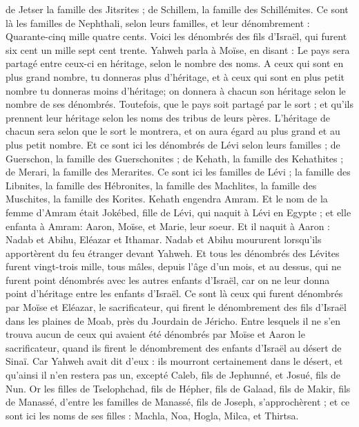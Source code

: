 \begin{multicols}{2}
de Jetser la famille des Jitsrites ; de Schillem, la famille des Schillémites.
Ce sont là les familles de Nephthali, selon leurs familles, et leur dénombrement : Quarante-cinq mille quatre cents.
Voici les dénombrés des fils d'Israël, qui furent six cent un mille sept cent trente.
Yahweh parla à Moïse, en disant :
Le pays sera partagé entre ceux-ci en héritage, selon le nombre des noms.
A ceux qui sont en plus grand nombre, tu donneras plus d'héritage, et à ceux qui sont en plus petit nombre tu donneras moins d'héritage; on donnera à chacun son héritage selon le nombre de ses dénombrés.
Toutefois, que le pays soit partagé par le sort ; et qu'ils prennent leur héritage selon les noms des tribus de leurs pères.
L'héritage de chacun sera selon que le sort le montrera, et on aura égard au plus grand et au plus petit nombre.
Et ce sont ici les dénombrés de Lévi selon leurs familles ; de Guerschon, la famille des Guerschonites ; de Kehath, la famille des Kehathites ; de Merari, la famille des Merarites.
Ce sont ici les familles de Lévi ; la famille des Libnites, la famille des Hébronites, la famille des Machlites, la famille des Muschites, la famille des Korites. Kehath engendra Amram.
Et le nom de la femme d'Amram était Jokébed, fille de Lévi, qui naquit à Lévi en Egypte ; et elle enfanta à Amram: Aaron, Moïse, et Marie, leur soeur.
Et il naquit à Aaron : Nadab et Abihu, Eléazar et Ithamar.
Nadab et Abihu moururent lorsqu'ils apportèrent du feu étranger devant Yahweh.
Et tous les dénombrés des Lévites furent vingt-trois mille, tous mâles, depuis l'âge d'un mois, et au dessus, qui ne furent point dénombrés avec les autres enfants d'Israël, car on ne leur donna point d'héritage entre les enfants d'Israël.
Ce sont là ceux qui furent dénombrés par Moïse et Eléazar, le sacrificateur, qui firent le dénombrement des fils d'Israël dans les plaines de Moab, près du Jourdain de Jéricho.
Entre lesquels il ne s'en trouva aucun de ceux qui avaient été dénombrés par Moïse et Aaron le sacrificateur, quand ils firent le dénombrement des enfants d'Israël au désert de Sinaï.
Car Yahweh avait dit d'eux : ils mourront certainement dans le désert, et qu'ainsi il n'en restera pas un, excepté Caleb, fils de Jephunné, et Josué, fils de Nun.
\VerseOne{}Or les filles de Tselophchad, fils de Hépher, fils de Galaad, fils de Makir, fils de Manassé, d'entre les familles de Manassé, fils de Joseph, s'approchèrent ; et ce sont ici les noms de ses filles : Machla, Noa, Hogla, Milca, et Thirtsa.

\end{multicols}
